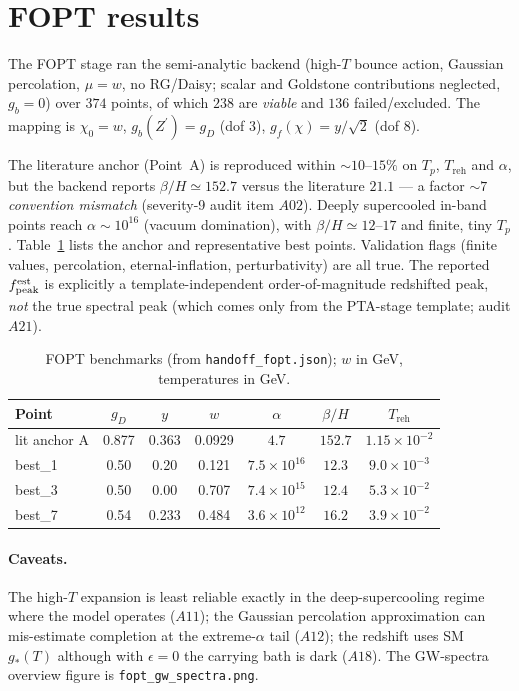 \documentclass[11pt]{article}
\newcommand{\Zp}{Z^{\prime}}
\newcommand{\gD}{g_{D}}
\newcommand{\Treh}{T_{\mathrm{reh}}}
\newcommand{\betaH}{\beta/H}
\begin{document}
\section{FOPT results}
\label{sec:fopt}
The FOPT stage ran the semi-analytic backend (high-$T$ bounce action, Gaussian percolation,
$\mu=w$, no RG/Daisy; scalar and Goldstone contributions neglected, $g_b=0$) over $374$ points,
of which $238$ are \emph{viable} and $136$ failed/excluded. The mapping is
$\chi_0=w$, $g_b(\Zp)=\gD$ (dof 3), $g_f(\chi)=y/\sqrt2$ (dof 8).

The literature anchor (Point~A) is reproduced within $\sim10\text{--}15\%$ on $T_p$, $\Treh$ and
$\alpha$, but the backend reports $\betaH\simeq152.7$ versus the literature $21.1$ --- a factor
$\sim7$ \emph{convention mismatch} (severity-9 audit item $A02$). Deeply supercooled in-band points
reach $\alpha\sim10^{16}$ (vacuum domination), with $\betaH\simeq12\text{--}17$ and finite, tiny $T_p$.
Table~\ref{tab:fopt} lists the anchor and representative best points.
Validation flags (finite values, percolation, eternal-inflation, perturbativity) are all true.
The reported $f_{\rm peak}^{\rm est}$ is explicitly a template-independent order-of-magnitude redshifted
peak, \emph{not} the true spectral peak (which comes only from the PTA-stage template; audit $A21$).

\begin{table}[h]
\centering
\small
\caption{FOPT benchmarks (from \texttt{handoff\_fopt.json}); $w$ in GeV, temperatures in GeV.}
\label{tab:fopt}
\begin{tabular}{lcccccc}
\toprule
Point & $\gD$ & $y$ & $w$ & $\alpha$ & $\betaH$ & $\Treh$ \\
\midrule
lit anchor A & 0.877 & 0.363 & 0.0929 & $4.7$ & $152.7$ & $1.15\times10^{-2}$ \\
best\_1 & 0.50 & 0.20 & 0.121 & $7.5\times10^{16}$ & $12.3$ & $9.0\times10^{-3}$ \\
best\_3 & 0.50 & 0.00 & 0.707 & $7.4\times10^{15}$ & $12.4$ & $5.3\times10^{-2}$ \\
best\_7 & 0.54 & 0.233 & 0.484 & $3.6\times10^{12}$ & $16.2$ & $3.9\times10^{-2}$ \\
\bottomrule
\end{tabular}
\end{table}

\paragraph{Caveats.} The high-$T$ expansion is least reliable exactly in the deep-supercooling
regime where the model operates ($A11$); the Gaussian percolation approximation can mis-estimate
completion at the extreme-$\alpha$ tail ($A12$); the redshift uses SM $g_*(T)$ although with
$\epsilon=0$ the carrying bath is dark ($A18$). The GW-spectra overview figure is
\texttt{fopt\_gw\_spectra.png}.
\end{document}
